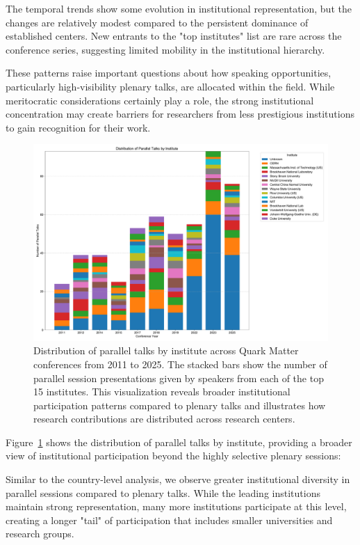 \documentclass[a4paper,11pt]{article}
\begin{document}
The temporal trends show some evolution in institutional representation, but the changes are relatively modest compared to the persistent dominance of established centers. New entrants to the "top institutes" list are rare across the conference series, suggesting limited mobility in the institutional hierarchy.

These patterns raise important questions about how speaking opportunities, particularly high-visibility plenary talks, are allocated within the field. While meritocratic considerations certainly play a role, the strong institutional concentration may create barriers for researchers from less prestigious institutions to gain recognition for their work.

\begin{figure}[H]
\centering
\includegraphics[width=\textwidth]{figures/parallel_talks_by_institute.pdf}
\caption{Distribution of parallel talks by institute across Quark Matter conferences from 2011 to 2025. The stacked bars show the number of parallel session presentations given by speakers from each of the top 15 institutes. This visualization reveals broader institutional participation patterns compared to plenary talks and illustrates how research contributions are distributed across research centers.}
\label{fig:institute_parallel}
\end{figure}

Figure~\ref{fig:institute_parallel} shows the distribution of parallel talks by institute, providing a broader view of institutional participation beyond the highly selective plenary sessions:

Similar to the country-level analysis, we observe greater institutional diversity in parallel sessions compared to plenary talks. While the leading institutions maintain strong representation, many more institutions participate at this level, creating a longer "tail" of participation that includes smaller universities and research groups.
\end{document}
